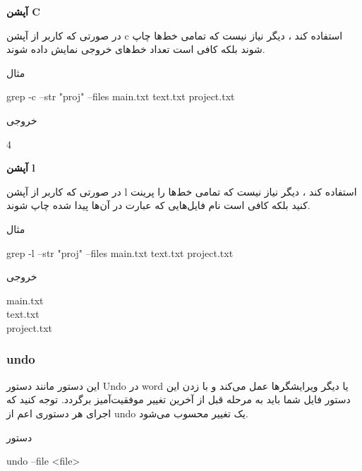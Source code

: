 \documentclass[]{article}
\begin{document}
\textbf{آپشن C}

در صورتی که کاربر از آپشن c استفاده کند ، دیگر نیاز نیست که تمامی خط‌ها چاپ شوند بلکه کافی است تعداد خط‌های خروجی نمایش داده شوند.

\begin{mybox}[colback=yellow]{مثال}
	\begin{latin}	
		grep -c --str "proj" --files main.txt text.txt project.txt
	\end{latin}
\end{mybox}

\begin{mybox}[colback=yellow]{خروجی}
	\begin{latin}	
		4
	\end{latin}
\end{mybox}


\textbf{آپشن l}

در صورتی که کاربر از آپشن l استفاده کند ، دیگر نیاز نیست که تمامی خط‌ها را پرینت کنید بلکه کافی است نام فایل‌هایی که عبارت در آن‌ها پیدا شده چاپ شوند.

\begin{mybox}[colback=yellow]{مثال}
	\begin{latin}	
		grep -l --str "proj" --files main.txt text.txt project.txt
	\end{latin}
\end{mybox}

\begin{mybox}[colback=yellow]{خروجی}
\begin{latin}
main.txt\\
text.txt\\
project.txt\\
\end{latin}
\end{mybox}

\subsubsection*{{\titr undo}}

این دستور مانند دستور Undo در word یا دیگر ویرایشگرها عمل می‌کند و با زدن این دستور فایل شما باید به مرحله قبل از آخرین تغییر موفقیت‌آمیز برگردد. توجه کنید که اجرای هر دستوری اعم از undo یک تغییر محسوب می‌شود.

\begin{mybox}[colback=yellow]{دستور}
	\begin{latin}	
		undo --file <file>
	\end{latin}
\end{mybox}
\end{document}
